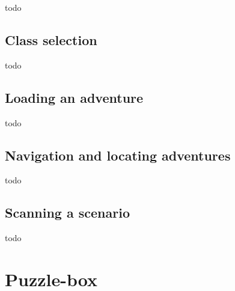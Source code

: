 \documentclass{sigchi-ext}
\begin{document}
todo

\subsection{Class selection}

todo



\subsection{Loading an adventure}

todo

\subsection{Navigation and locating adventures}

todo

\subsection{Scanning a scenario}

todo



\section{Puzzle-box}
\end{document}
